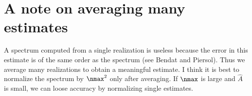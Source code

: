 \documentclass[11pt]{article}
\begin{document}
\section{A note on averaging many estimates}
A spectrum computed from a single realization is useless because the error in this estimate is of the same order as the spectrum (see Bendat and Piersol). Thus we average many realizations to obtain a meaningful estimate. I think it is best to normalize the spectrum by $\nmax^2$ only after averaging. If $\nmax$ is large and $\hat{A}$ is small, we can loose accuracy by normalizing single estimates.
\end{document}
